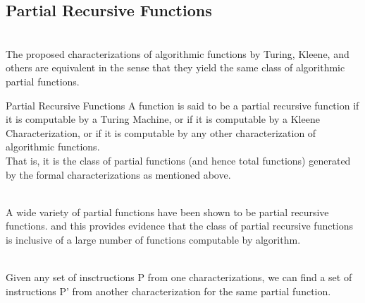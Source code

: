 \documentclass[openany]{book}
\begin{document}
\subsection{Partial Recursive Functions}
\begin{mytheorem}
     \\
    The proposed characterizations of algorithmic functions by Turing, Kleene, and others are equivalent in the sense that they yield the same class of algorithmic partial functions. \\
\end{mytheorem}
\begin{mydefinition}{Partial Recursive Functions}
    A function is said to be a partial recursive function if it is computable by a Turing Machine, or if it is computable by a Kleene Characterization, or if it is computable by any other characterization of algorithmic functions. \\
    That is, it is the class of partial functions (and hence total functions) generated by the formal characterizations as mentioned above. 
\end{mydefinition}
\begin{mytheorem}
     \\
    A wide variety of partial functions have been shown to be partial recursive functions.  and this provides evidence that the class of partial recursive functions is inclusive of a large number of functions computable by algorithm. 
\end{mytheorem}
\begin{mytheorem}
     \\
    Given any set of insctructions P from one characterizations, we can find a set of instructions P' from another characterization for the same partial function. 
\end{mytheorem}
\end{document}
